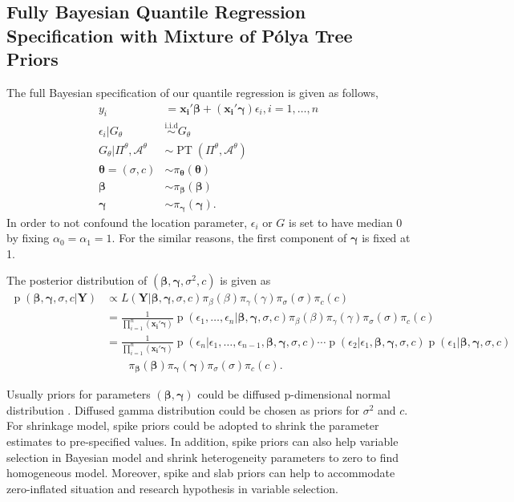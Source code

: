 \documentclass[12pt]{article}
\newcommand{\polya}{P\'{o}lya}
\newcommand{\iid}{\stackrel{\text{i.i.d}}{\sim}}
\DeclareMathOperator{\pr}{p}
\DeclareMathOperator{\pt}{PT}
\begin{document}
\subsection{Fully Bayesian Quantile Regression Specification with
  Mixture of \polya{} Tree Priors}
The full Bayesian specification of our quantile regression is given as
follows,
\begin{align*}
  y_i& = \bm{x_i'\beta} + (\bm{x_i'\gamma}) \epsilon_{i}, i = 1,
  \ldots,
  n \\
  \epsilon_i |G_{\theta} & \iid G_{\theta} \\
  G_{\theta}|\Pi^{\theta}, \mathcal{A}^{\theta} & \sim \pt
  (\Pi^{\theta}, \mathcal{A}^{\theta}) \\
  \bm{\theta} = (\sigma, c) & \sim \pi_{\bm \theta}(\bm \theta) \\
  \bm{\beta} & \sim \pi_{\bm \beta}(\bm \beta)\\
  \bm{\gamma} &\sim \pi_{\bm \gamma}(\bm \gamma).
\end{align*}
In order to not confound the location parameter, $\epsilon_i $ or $G$
is set to have median 0 by fixing $\alpha_0=\alpha_1 = 1$. For the
similar reasons, the first component of $\bm{\gamma}$ is fixed at 1.

The posterior distribution of $(\bm{\beta}, \bm{\gamma}, \sigma^2, c)$
is given as
\begin{align*}
  \pr(\bm{\beta}, \bm{\gamma}, \sigma, c|\bm{Y}) & \propto L(\bm{Y}|
  \bm{\beta}, \bm{\gamma}, \sigma, c) \pi_{\beta}(\beta)
  \pi_{\gamma}(\gamma) \pi_{\sigma}(\sigma) \pi_c(c) \\
  & = \frac{1}{\prod_{i=1}^n (\bm{x_i'\gamma})} \pr \left( \epsilon_1,
    \ldots, \epsilon_n | \bm{\beta}, \bm{\gamma}, \sigma, c\right)
  \pi_{\beta}(\beta)
  \pi_{\gamma}(\gamma) \pi_{\sigma}(\sigma) \pi_c(c) \\
  & = \frac{1}{\prod_{i=1}^n (\bm{x_i'\gamma})} \pr \left(\epsilon_n|
    \epsilon_1, \ldots, \epsilon_{n-1} , \bm{\beta}, \bm{\gamma},
    \sigma, c\right) \cdots \pr \left(\epsilon_2| \epsilon_1,
    \bm{\beta}, \bm{\gamma}, \sigma, c\right) \pr \left(\epsilon_1|
    \bm{\beta}, \bm{\gamma},
    \sigma, c\right)\\
  & \qquad \pi_{\bm{\beta}}(\bm{\beta}) \pi_{\bm{\gamma}}(\bm{\gamma})
  \pi_{\sigma}(\sigma) \pi_c(c) .
\end{align*}

Usually priors for parameters $(\bm{\beta}, \bm{\gamma})$ could be
diffused p-dimensional normal distribution . Diffused gamma
distribution could be chosen as priors for $\sigma^2$ and $c$. For
shrinkage model, spike priors could be adopted to shrink the parameter
estimates to pre-specified values. In addition, spike priors can also
help variable selection in Bayesian model and shrink heterogeneity
parameters to zero to find homogeneous model. Moreover, spike and slab
priors can help to accommodate zero-inflated situation and research
hypothesis in variable selection.
\end{document}
